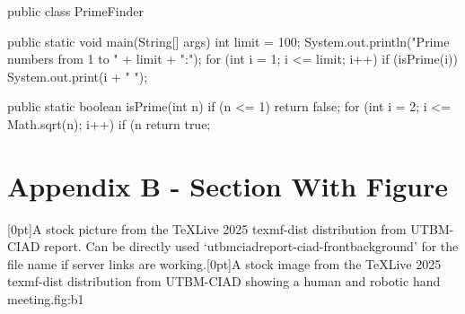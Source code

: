 \documentclass[ms-thesis,mathdesign,chpterrefs,showgrid]{ndsu-thesis-tagged}%
\begin{document}

\begin{mytlisting}[fontsize=\normalsize, frame=single, numbers=none, xleftmargin=0pt]
public class PrimeFinder {
    public static void main(String[] args) {
        int limit = 100;
        System.out.println("Prime numbers from 1 to " + limit + ":");
        for (int i = 1; i <= limit; i++) {
            if (isPrime(i)) {
                System.out.print(i + " ");
            }
        }
    }

    public static boolean isPrime(int n) {
        if (n <= 1) return false;
        for (int i = 2; i <= Math.sqrt(n); i++) {
            if (n %
        }
        return true;
    }
}
\end{mytlisting}

\repText[38]

\checkEndRefsection%




\checkBeginRefsection%

\noindent\start {}


\section{Appendix B - Section With Figure}
\repText[38]

[0pt]{A stock picture from the TeXLive 2025 texmf-dist distribution from UTBM-CIAD report. Can be directly used `utbmciadreport-ciad-frontbackground' for the file name if server links are working.}[0pt]{A stock image from the TeXLive 2025 texmf-dist distribution from UTBM-CIAD showing a human and robotic hand meeting.}{fig:b1}
\end{document}
